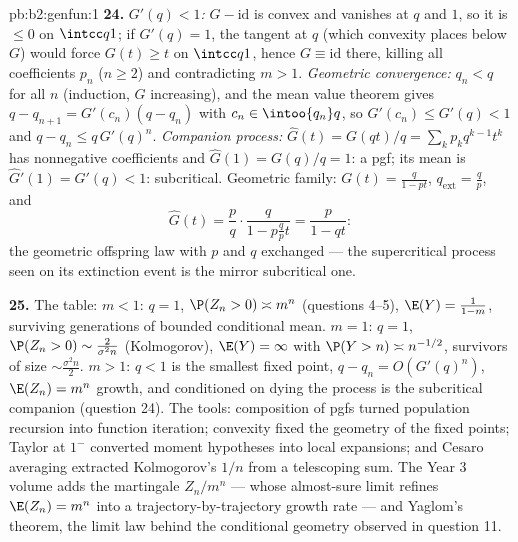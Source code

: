 \begin{solution}{pb:b2:genfun:1}
\textbf{24.} \emph{$G'(q) < 1$:} $G - \mathrm{id}$ is convex
and vanishes at $q$ and $1$, so it is $\leq 0$ on $\intcc
q1$; if $G'(q) = 1$, the tangent at $q$ (which convexity
places below $G$) would force $G(t) \geq t$ on $\intcc q1$,
hence $G \equiv \mathrm{id}$ there, killing all coefficients
$p_n$ ($n \geq 2$) and contradicting $m > 1$. \emph{Geometric
convergence:} $q_n < q$ for all $n$ (induction, $G$
increasing), and the mean value theorem gives $q - q_{n+1} =
G'(c_n)(q - q_n)$ with $c_n \in \intoo{q_n}q$, so $G'(c_n)
\leq G'(q) < 1$ and $q - q_n \leq q\,G'(q)^n$.
\emph{Companion process:} $\widehat G(t) = G(qt)/q =
\sum_kp_kq^{k-1}t^k$ has nonnegative coefficients and
$\widehat G(1) = G(q)/q = 1$: a pgf; its mean is $\widehat
G'(1) = G'(q) < 1$: subcritical. Geometric family: $G(t) =
\frac{q}{1-pt}$, $q_{\mathrm{ext}} = \frac qp$, and
\[
\widehat G(t) = \frac pq\cdot\frac{q}{1 - p\frac qp t}
= \frac{p}{1 - qt} :
\]
the geometric offspring law with $p$ and $q$ exchanged ---
the supercritical process seen on its extinction event is the
mirror subcritical one.

\textbf{25.} The table: $m < 1$: $q = 1$, $\P(Z_n > 0)
\asymp m^n$ (questions 4--5), $\E(Y) = \frac1{1-m}$,
surviving generations of bounded conditional mean. $m = 1$:
$q = 1$, $\P(Z_n > 0) \sim \frac2{\sigma^2n}$ (Kolmogorov),
$\E(Y) = \infty$ with $\P(Y > n) \asymp n^{-1/2}$, survivors
of size $\sim \frac{\sigma^2n}2$. $m > 1$: $q < 1$ is the
smallest fixed point, $q - q_n = O(G'(q)^n)$, $\E(Z_n) = m^n$
growth, and conditioned on dying the process is the
subcritical companion (question 24). The tools: composition
of pgfs turned population recursion into function iteration;
convexity fixed the geometry of the fixed points; Taylor at
$1^-$ converted moment hypotheses into local expansions; and
Cesaro averaging extracted Kolmogorov's $1/n$ from a
telescoping sum. The Year 3 volume adds the martingale $Z_n/
m^n$ --- whose almost-sure limit refines $\E(Z_n) = m^n$ into
a trajectory-by-trajectory growth rate --- and Yaglom's
theorem, the limit law behind the conditional geometry
observed in question 11.
\end{solution}
